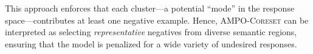This approach enforces that each cluster---a potential ``mode'' in the response space---contributes at least one negative example. Hence, \textsc{AMPO-Coreset} can be interpreted as selecting \emph{representative} negatives from diverse semantic regions, ensuring that the model is penalized for a wide variety of undesired responses.

